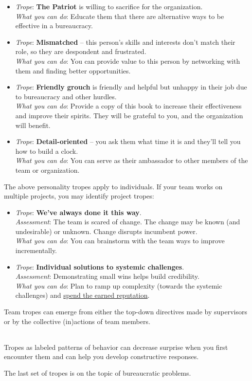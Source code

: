 \begin{itemize}
    \item \textit{Trope}: \textbf{The Patriot} is willing to sacrifice for the organization. \\
    \textit{What you can do}: Educate them that there are alternative ways to be effective in a bureaucracy.
    
    \item \textit{Trope}: \textbf{Mismatched} -- this person's skills and interests don't match their role, so they are despondent and frustrated. \\
    \textit{What you can do}: You can provide value to this person by networking with them and finding better opportunities.
    
    \item \textit{Trope}: \textbf{Friendly grouch} is friendly and helpful but unhappy in their job due to bureaucracy and other hurdles. \\
    \textit{What you can do}: Provide a copy of this book to increase their effectiveness and improve their spirits. They will be grateful to you, and the organization will benefit.
    
    \item \textit{Trope}: \textbf{Detail-oriented} -- you ask them what time it is and they'll tell you how to build a clock. \\
    \textit{What you can do}: You can serve as their ambassador to other members of the team or organization.  
\end{itemize}


The above personality tropes apply to individuals. If your team works on multiple projects, you may identify project tropes:
\begin{itemize}
    \item \textit{Trope}: \textbf{We've always done it this way}.\\
    \textit{Assessment}: The team is scared of change. The change may be known (and undesirable) or unknown. Change disrupts incumbent power.\\
    \textit{What you can do}: You can brainstorm with the team ways to improve incrementally. 

    \item \textit{Trope}: \textbf{Individual solutions to systemic challenges}.\\
    \textit{Assessment}: Demonstrating small wins helps build credibility. \\
    \textit{What you can do}: Plan to ramp up  complexity (towards the systemic challenges) and \hyperref[sec:reputation]{spend the earned reputation}.
\end{itemize}
Team tropes can emerge from either the top-down directives made by supervisors or by the collective (in)actions of team members.


\ \\


Tropes as labeled patterns of behavior can decrease surprise when you first encounter them and can help you develop constructive responses. 

The last set of tropes is on the topic of bureaucratic problems. 